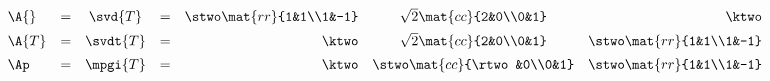\begin{equation*}
  \begin{array}{lcccrcr}
     \A{} &=& \svd{T} &=& \stwo \mat{rr}{1&1\\1&-1} & 
     \sqrt{2} \mat{cc}{2&0\\0&1} &
     \ktwo\\[5pt]
     \A{T} &=& \svdt{T} &=& \ktwo & \sqrt{2} \mat{cc}{2&0\\0&1} & \stwo \mat{rr}{1&1\\1&-1}\\[5pt]
     \Ap &=& \mpgi{T} &=& \ktwo & \stwo \mat{cc}{\rtwo&0\\0&1} & \stwo \mat{rr}{1&1\\1&-1}
  \end{array}
\end{equation*}


